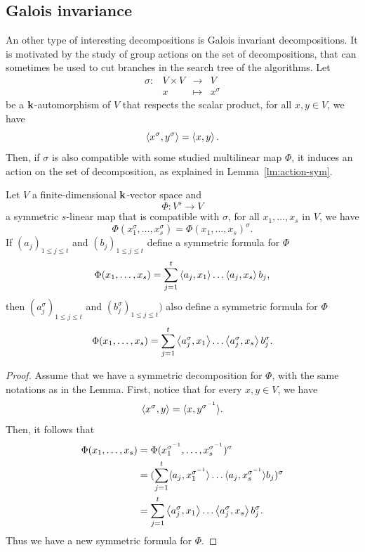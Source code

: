 \subsection{Galois invariance}

An other type of interesting decompositions is Galois invariant decompositions.
It is motivated by the study of group actions on the set of decompositions, that
can sometimes be used to cut branches in the search tree of the algorithms.
%
Let 
\[
 \begin{array}{cccc}
   \sigma: & V\times V &\to&V\\
 &x&\mapsto&x^\sigma
 \end{array}
\]
be a $\mathbf{k}$-automorphism of $V$ that respects the scalar product, \ie for all $x,
y\in V$, we have
\[
  \left\langle x^\sigma,y^\sigma\right\rangle = \left\langle x,y\right\rangle.
\]
Then, if $\sigma$ is also compatible with some studied multilinear map $\Phi$, it induces
an action on the set of decomposition, as explained in
Lemma~\ref{lm:action-sym}.
\begin{lm}
  \label{lm:action-sym}
  Let $V$ a finite-dimensional $\mathbf{k}$-vector space and
  \[
    \Phi:V^s\to V
  \]
  a symmetric $s$-linear map that is compatible with $\sigma$, \ie for all $x_1,
  \dots, x_s$ in $V$, we have
  \[
    \Phi(x_1^\sigma, \dots, x_s^\sigma) = \Phi(x_1, \dots, x_s)^\sigma.
  \]
  If $(a_j)_{1\leq j \leq t}$ and $(b_j)_{1\leq j \leq t}$ define a symmetric
  formula for $\Phi$
  \[
    \Phi(x_1, \dots, x_s) = \sum_{j=1}^t\left\langle a_j,x_1\right\rangle\dots\left\langle a_j,x_s\right\rangle b_j,
  \]
  then $(a_j^\sigma)_{1\leq j\leq t}$ and $(b_{j}^\sigma)_{1\leq j\leq t})$ also
  define a symmetric formula for $\Phi$
  \[
    \Phi(x_1, \dots, x_s) =
    \sum_{j=1}^t\left\langle a_j^\sigma,x_1\right\rangle\dots\left\langle a_j^\sigma,x_s\right\rangle b_j^\sigma.
  \]
\end{lm}
\begin{proof}
 Assume that we have a symmetric decomposition for $\Phi$, with the same
 notations as in the Lemma. First, notice that for every $x,y\in V$, we have
 \[
   \left\langle x^\sigma,y\right\rangle = \langle{x},{y^{\sigma^{-1}}}\rangle.
 \]
 Then, it follows that
 \begin{align*}
   \Phi(x_1, \dots, x_s) &= \Phi(x_1^{\sigma^{-1}}, \dots,
   x_{s}^{\sigma^{-1}})^\sigma\\
   &=
   (\sum_{j=1}^t\langle{a_j},{x_1^{\sigma^{-1}}}\rangle\dots\langle{a_j},{x_s^{\sigma^{-1}}}\rangle
   b_j)^\sigma\\
   &= \sum_{j=1}^t\left\langle a_j^{\sigma},x_1\right\rangle\dots\left\langle a_j^\sigma,x_s\right\rangle b_j^\sigma.
 \end{align*}
 Thus we have a new symmetric formula for $\Phi$.
\end{proof}
